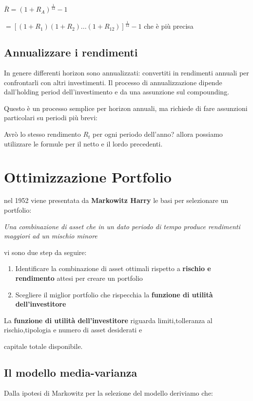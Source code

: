 \documentclass[a4paper,11pt]{report}
\begin{document}
{\begin{enumerate}
		$ \bar{R} = (1+R_A)^{\frac {1}{12}} - 1$

		$ =[(1+R_1)(1+R_2)...(1+R_{12})]^{\frac{1}{12}} - 1$ che è più precisa

\end {enumerate}

\section{Annualizzare i rendimenti}
	In genere differenti horizon sono annualizzati: convertiti in rendimenti annuali per confrontarli con altri investimenti. \newline
	Il processo di annualizzazione dipende dall'holding period dell'investimento e da una assunzione sul compounding.

 	Questo è un processo semplice per horizon annuali, ma richiede di fare assunzioni particolari su periodi più brevi:

	Avrò lo stesso rendimento $R_t$ per ogni periodo dell'anno? allora possiamo utilizzare le formule per il netto e il lordo precedenti.
 \newpage
  
\chapter{Ottimizzazione Portfolio}
	nel 1952 viene presentata da \textbf{Markowitz Harry} le basi per selezionare un portfolio:

\begin{center}
	{\emph{Una combinazione di asset che in un dato periodo di tempo produce rendimenti maggiori ad un mischio minore}}
\end{center}

	vi sono due step da seguire:
\begin{enumerate}
	\item Identificare la combinazione di asset ottimali rispetto a \textbf{rischio e rendimento} attesi per creare un portfolio
	\item Scegliere il miglior portfolio che rispecchia la \textbf{funzione di utilità dell'investitore}
\end{enumerate}
	La \textbf{funzione di utilità dell'investitore} riguarda limiti,tolleranza al rischio,tipologia e numero di asset desiderati e

	capitale totale disponibile.
\newpage

\section{Il modello media-varianza}
	Dalla ipotesi di Markowitz per la selezione del modello deriviamo che:

}
\end{document}
